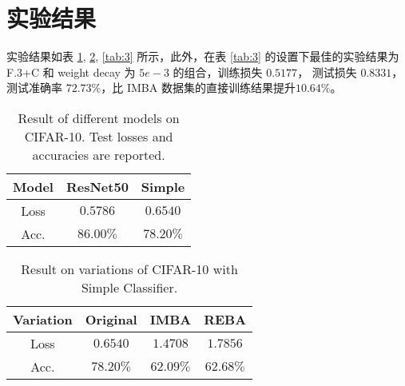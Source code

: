 \documentclass[a4paper]{article}
\begin{document}
\section{实验结果}
实验结果如表 \ref{tab:1}, \ref{tab:2}, \ref{tab:3} 所示，此外，在表 \ref{tab:3} 的设置下最佳的实验结果为 F.3+C 和 weight decay 为 $5e-3$ 的组合，训练损失 $0.5177$， 测试损失 $0.8331$，测试准确率 $\mathbf{72.73\%}$，比 IMBA 数据集的直接训练结果提升$10.64\%$。
\begin{multicols}{2}
    \begin{table}[H]
        \centering
        \begin{tabular}{ccc}
            \toprule
            Model&ResNet50&Simple\\
            \midrule
            Loss& $\mathbf{0.5786}$&$0.6540$\\
            Acc.&$\mathbf{86.00\%}$&$78.20\%$\\
            \bottomrule
            
        \end{tabular}
        \caption{Result of different models on CIFAR-10. Test losses and accuracies are reported.}
        \label{tab:1}
    \end{table}

    \begin{table}[H]
        \centering
        \begin{tabular}{cccc}
            \toprule
            Variation&Original&IMBA&REBA\\
            \midrule
            Loss&$0.6540$&$1.4708$&$1.7856$\\
            Acc.&$78.20\%$&$62.09\%$&$62.68\%$\\
            \bottomrule
        \end{tabular}
        \caption{Result on variations of CIFAR-10 with Simple Classifier.}
        \label{tab:2}
    \end{table}

\end{multicols}
\end{document}
